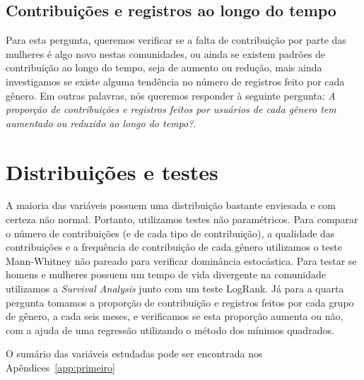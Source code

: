 \subsection{Contribuições e registros ao longo do tempo}

Para esta pergunta, queremos verificar se a falta de contribuição por parte das mulheres é algo novo nestas comunidades, ou ainda se existem padrões de contribuição ao longo do tempo, seja de aumento ou redução, mais ainda investigamos se existe alguma tendência no número de registros feito por cada gênero. Em outras palavras, nós queremos responder à seguinte pergunta: \textit{A proporção de contribuições e registros feitos por usuários de cada gênero tem aumentado ou reduzido ao longo do tempo?}. 

\section{Distribuições e testes}


A maioria das variáveis possuem uma distribuição bastante enviesada e com certeza não normal. Portanto, utilizamos testes não paramétricos. Para comparar o número de contribuições (e de cada tipo de contribuição), a qualidade das contribuições e a frequência de contribuição de cada gênero utilizamos o teste Mann-Whitney não pareado para verificar dominância estocástica. Para testar se homens e mulheres possuem um tempo de vida divergente na comunidade utilizamos a \textit{Survival Analysis} junto com um teste  LogRank. Já para a quarta pergunta tomamos a proporção de contribuição e registros feitos por cada grupo de gênero, a cada seis meses, e verificamos se esta proporção aumenta ou não, com a ajuda de uma regressão utilizando o método dos mínimos quadrados.

O sumário das variáveis estudadas pode ser encontrada nos Apêndices~\ref{app:primeiro}


